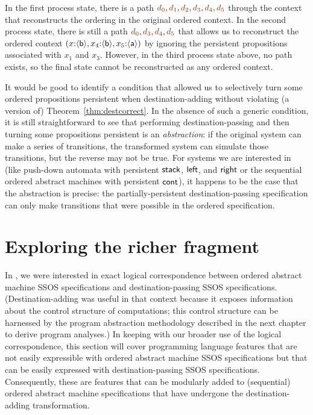 In the
first process state, there is a path 
$\lf{d_0}, \lf{d_1}, \lf{d_2}, \lf{d_3}, \lf{d_4}, \lf{d_5}$ through
the context that reconstructs the ordering in the original ordered context.
In the second process state, there is still a path 
$\lf{d_0}, \lf{d_3}, \lf{d_4}, \lf{d_5}$ that
allows us to reconstruct the ordered context
$(x{:}\langle {\sf b} \rangle,
  x_4{:}\langle {\sf b} \rangle, x_5{:}\langle {\sf a} \rangle)$ by ignoring the persistent
propositions associated with $x_1$ and $x_3$. 
However, in the third process state above, no path exists, so the final
state cannot be reconstructed as any ordered context. 

It would be good to identify a condition that allowed us to
selectively turn some ordered propositions persistent when
destination-adding without violating (a version of)
Theorem~\ref{thm:destcorrect}. In the absence of such a generic
condition, it is still straightforward to see that performing
destination-passing and then turning some propositions persistent is
an {\it abstraction}: if the original system can make a series of
transitions, the transformed system can simulate those transitions,
but the reverse may not be true. For systems we are interested in
(like push-down automata with persistent ${\sf stack}$, ${\sf left}$,
and ${\sf right}$ or the sequential ordered abstract machines with
persistent ${\sf cont}$), it happens to be the case that the
abstraction is precise: the partially-persistent destination-passing
specification can only make transitions that were possible in the
ordered specification.

\section{Exploring the richer fragment}

In \cite{simmons11logical}, we were interested in exact logical
correspondence between ordered abstract machine SSOS specifications
and destination-passing SSOS specifications. (Destination-adding was
useful in that context because it exposes information about the
control structure of computations; this control structure can be
harnessed by the program abstraction methodology described in the next
chapter to derive program analyses.) In keeping with our broader use
of the logical correspondence, this section will cover programming
language features that are not easily expressible with ordered
abstract machine SSOS specifications but that can be easily expressed
with destination-passing SSOS specifications. Consequently, these are
features that can be modularly added to (sequential) ordered abstract
machine specifications that have undergone the destination-adding
transformation.

